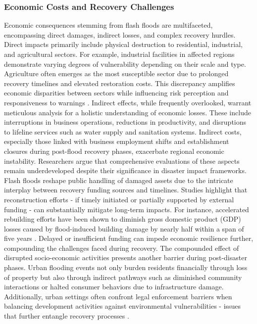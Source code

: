 \subsubsection{Economic Costs and Recovery Challenges}
Economic consequences stemming from flash floods are multifaceted, encompassing direct damages, indirect losses, and complex recovery hurdles. Direct impacts primarily include physical destruction to residential, industrial, and agricultural sectors. For example, industrial facilities in affected regions demonstrate varying degrees of vulnerability depending on their scale and type. Agriculture often emerges as the most susceptible sector due to prolonged recovery timelines and elevated restoration costs. This discrepancy amplifies economic disparities between sectors while influencing risk perception and responsiveness to warnings \citep{Zhang2024}.
Indirect effects, while frequently overlooked, warrant meticulous analysis for a holistic understanding of economic losses. These include interruptions in business operations, reductions in productivity, and disruptions to lifeline services such as water supply and sanitation systems. Indirect costs, especially those linked with business employment shifts and establishment closures during post-flood recovery phases, exacerbate regional economic instability. Researchers argue that comprehensive evaluations of these aspects remain underdeveloped despite their significance in disaster impact frameworks.
Flash floods reshape public handling of damaged assets due to the intricate interplay between recovery funding sources and timelines. Studies highlight that reconstruction efforts - if timely initiated or partially supported by external funding - can substantially mitigate long-term impacts. For instance, accelerated rebuilding efforts have been shown to diminish gross domestic product (GDP) losses caused by flood-induced building damage by nearly half within a span of five years \citep{Abegaz2024}. Delayed or insufficient funding can impede economic resilience further, compounding the challenges faced during recovery.
The compounded effect of disrupted socio-economic activities presents another barrier during post-disaster phases. Urban flooding events not only burden residents financially through loss of property but also through indirect pathways such as diminished community interactions or halted consumer behaviors due to infrastructure damage. Additionally, urban settings often confront legal enforcement barriers when balancing development activities against environmental vulnerabilities - issues that further entangle recovery processes \citep{Saad2024}.
